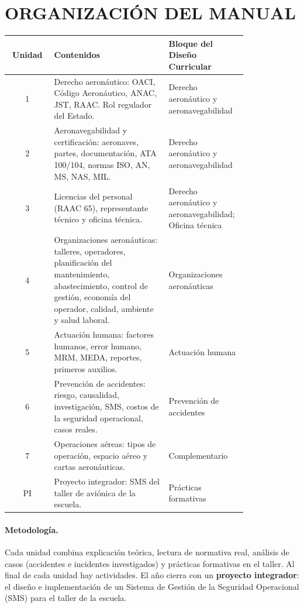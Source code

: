 \section*{ORGANIZACIÓN DEL MANUAL}

\begin{center}
\small
\begin{tabular}{|c|>{\raggedright\arraybackslash}p{0.48\linewidth}|>{\raggedright\arraybackslash}p{0.33\linewidth}|}
\hline
\textbf{Unidad} & \textbf{Contenidos} & \textbf{Bloque del Diseño Curricular} \\ \hline
1 & Derecho aeronáutico: OACI, Código Aeronáutico, ANAC, JST, RAAC. Rol regulador del Estado. &
Derecho aeronáutico y aeronavegabilidad \\ \hline
2 & Aeronavegabilidad y certificación: aeronaves, partes, documentación, ATA 100/104, normas ISO,
AN, MS, NAS, MIL. & Derecho aeronáutico y aeronavegabilidad \\ \hline
3 & Licencias del personal (RAAC 65), representante técnico y oficina técnica. & Derecho
aeronáutico y aeronavegabilidad; Oficina técnica \\ \hline
4 & Organizaciones aeronáuticas: talleres, operadores, planificación del mantenimiento,
abastecimiento, control de gestión, economía del operador, calidad, ambiente y salud laboral. &
Organizaciones aeronáuticas \\ \hline
5 & Actuación humana: factores humanos, error humano, MRM, MEDA, reportes, primeros auxilios. &
Actuación humana \\ \hline
6 & Prevención de accidentes: riesgo, causalidad, investigación, SMS, costos de la seguridad
operacional, casos reales. & Prevención de accidentes \\ \hline
7 & Operaciones aéreas: tipos de operación, espacio aéreo y cartas aeronáuticas. &
Complementario \\ \hline
PI & Proyecto integrador: SMS del taller de aviónica de la escuela. & Prácticas formativas \\
\hline
\end{tabular}
\end{center}

\paragraph*{Metodología.} Cada unidad combina explicación teórica, lectura de normativa real,
análisis de casos (accidentes e incidentes investigados) y prácticas formativas en el taller.
Al final de cada unidad hay actividades. El año cierra con un \textbf{proyecto integrador}: el
diseño e implementación de un Sistema de Gestión de la Seguridad Operacional (SMS) para el
taller de la escuela.

